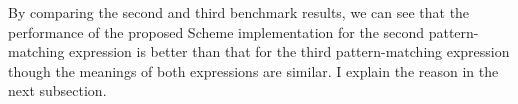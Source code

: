 \medskip

\medskip

\medskip

By comparing the second and third benchmark results, we can see that the performance of the proposed Scheme implementation for the second pattern-matching expression is better than that for the third pattern-matching expression though the meanings of both expressions are similar.
I explain the reason in the next subsection.


